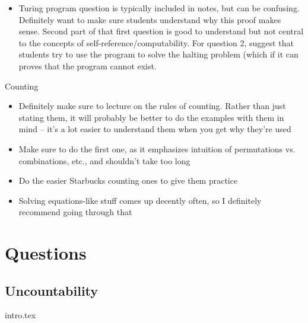 \documentclass{exam}
\begin{document}
\begin{questions}
\begin{itemize}
\item Turing program question is typically included in notes, but can be confusing. Definitely want to make sure students understand why this proof makes sense. Second part of that first question is good to understand but not central to the concepts of self-reference/computability. For question 2, suggest that students try to use the program to solve the halting problem (which if it can proves that the program cannot exist.
\end{itemize}
\item Counting
\begin{itemize}
\item Definitely make sure to lecture on the rules of counting. Rather than just stating them, it will probably be better to do the examples with them in mind – it’s a lot easier to understand them when you get why they’re used
\item Make sure to do the first one, as it emphasizes intuition of permutations vs. combinations, etc., and shouldn’t take too long
\item Do the easier Starbucks counting ones to give them practice
\item Solving equations-like stuff comes up decently often, so I definitely recommend going through that
\end{itemize}
\end{questions}

\section{Questions}
\subsection{Uncountability}
\begin{enumerate}
{intro.tex}
\end{enumerate}
\end{document}
